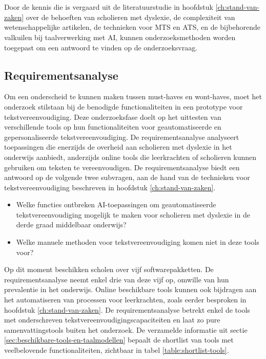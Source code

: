 
\chapter{}%
\label{ch:methodologie}

Door de kennis die is vergaard uit de literatuurstudie in hoofdstuk \ref{ch:stand-van-zaken} over de behoeften van scholieren met dyslexie, de complexiteit van wetenschappelijke artikelen, de technieken voor MTS en ATS, en de bijbehorende valkuilen bij taalverwerking met AI, kunnen onderzoeksmethoden worden toegepast om een antwoord te vinden op de onderzoeksvraag.

\section{Requirementsanalyse}
\label{sec:requirementsanalyse}


Om een onderscheid te kunnen maken tussen must-haves en wont-haves, moet het onderzoek stilstaan bij de benodigde functionaliteiten in een prototype voor tekstvereenvoudiging. Deze onderzoeksfase doelt op het uittesten van verschillende tools op hun functionaliteiten voor geautomatiseerde en gepersonaliseerde tekstvereenvoudiging. De requirementsanalyse analyseert toepassingen die enerzijds de overheid aan scholieren met dyslexie in het onderwijs aanbiedt, anderzijds online tools die leerkrachten of scholieren kunnen gebruiken om teksten te vereenvoudigen. De requirementsanalyse biedt een antwoord op de volgende twee subvragen, aan de hand van de technieken voor tekstvereenvoudiging beschreven in hoofdstuk \ref{ch:stand-van-zaken}. 

\begin{itemize}
	\item Welke functies ontbreken AI-toepassingen om geautomatiseerde tekstvereenvoudiging mogelijk te maken voor scholieren met dyslexie in de derde graad middelbaar onderwijs?
	\item Welke manuele methoden voor tekstvereenvoudiging komen niet in deze tools voor?
\end{itemize}

Op dit moment beschikken scholen over vijf softwarepakketten. De requirementsanalyse neemt enkel drie van deze vijf op, omwille van hun prevalentie in het onderwijs. Online beschikbare tools kunnen ook bijdragen aan het automatiseren van processen voor leerkrachten, zoals eerder besproken in hoofdstuk \ref{ch:stand-van-zaken}. De requirementsanalyse betrekt enkel de tools met onderschreven tekstvereenvoudigingscapaciteiten en laat zo pure samenvattingstools buiten het onderzoek. De verzamelde informatie uit sectie \ref{sec:beschikbare-tools-en-taalmodellen} bepaalt de shortlist van tools met veelbelovende functionaliteiten, zichtbaar in tabel \ref{table:shortlist-tools}.

